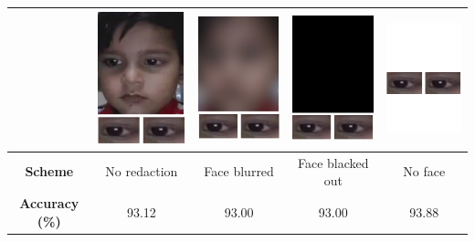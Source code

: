 \begin{table}[h]
\begin{tabular}{|c||c|c|c|c|}
         & \includegraphics[scale=0.2,valign=m]{GazePreservingRedaction/No_redaction} & \includegraphics[scale=0.2,valign=m]{GazePreservingRedaction/Face_blurred} & \includegraphics[scale=0.2,valign=m]{GazePreservingRedaction/Face_blacked} & \includegraphics[scale=0.2,valign=m]{GazePreservingRedaction/No_face} \\
      \hline
      \textbf{Scheme} & No redaction & Face blurred & Face blacked out & No face \\
      \hline
      \textbf{Accuracy (\%)} & 93.12 & 93.00 & 93.00 & 93.88 \\
      \hline
    \end{tabular}  
\end{table}

